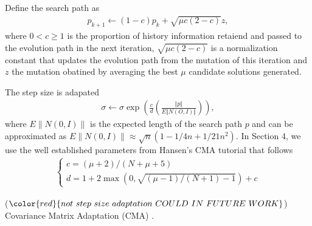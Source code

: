 Define the search path as 
\begin{align}
p_{k+1} \leftarrow (1-c)p_k + \sqrt{\mu c (2-c)} z,
\end{align}
where $0<c \geq 1$ is the proportion of history information retaiend and passed to the evolution path in the next iteration, $ \sqrt{\mu c (2-c)}$ is a normalization constant that updates the evolution path from the mutation of this iteration and $z$ the mutation obatined by averaging the best $\mu$ candidate solutions generated. 

The step size is adapated 
\begin{align}
\sigma \leftarrow \sigma \exp \left (  \frac{c}{d}  \left( \frac{\Vert p\Vert}{E \Vert N(O,I)\Vert } \right) \right ),
\end{align}
where $E\| N(0,I) \|$ is the expected length of the search path $p$ and can be approximated as $E\| N(0,I) \| \approx \sqrt{n} (1-1/4n + 1/21n^2)$. In Section 4, we use the well established parameters from Hansen's CMA tutorial \cite{hansen2016cma} that follows 
\begin{align}
\begin{cases}
c = (\mu+2)/(N+\mu+5)\\
d=1+2 \max\left (0, \sqrt{(\mu-1)/(N+1)-1} \right)+c
\end{cases}
\end{align}



($\color{red}{not\ step\ size\ adaptation\ COULD\ IN\ FUTURE\ WORK}$) Covariance Matrix Adaptation (CMA) \cite{Hansen:2003:RTC:772374.772376}. 






